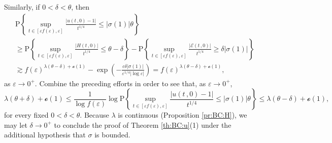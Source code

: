 \documentclass[reqno]{amsart}
\newcommand{\<}{\langle}
\renewcommand{\>}{\rangle}
\renewcommand{\P}{\mathrm{P}}
\newcommand{\1}{\mathbb{1}}
\renewcommand{\ge}{\geqslant}
\renewcommand{\le}{\leqslant}
\theoremstyle{definition}
\numberwithin{equation}{section}
\begin{document}
Similarly, if $0<\delta<\theta$, then
\begin{align*}
	&\P\left\{ \sup_{t \in [\varepsilon f(\varepsilon),\varepsilon]}
		\frac{|u(t\,,0)-1|}{t^{1/4}} \le |\sigma(1)|\theta \right\} \\
	&\ge \P\left\{ \sup_{t \in [\varepsilon f(\varepsilon),\varepsilon]}
		\frac{|H(t\,,0)|}{t^{1/4}} \le \theta - \delta \right\} - 
		\P\left\{ \sup_{t \in [\varepsilon f(\varepsilon),\varepsilon]}
		\frac{|\mathscr{E}(t\,,0)|}{t^{1/4}} \ge \delta |\sigma(1)| \right\}\\
	&\gtrsim f(\varepsilon)^{\lambda(\theta-\delta)+\mathscr{o}(1)} - 
		\exp\left( - \frac{c\delta|\sigma(1)|}{\varepsilon^{1/4}|\log\varepsilon|}\right)
		= f(\varepsilon)^{\lambda(\theta-\delta) + \mathscr{o}(1)},
\end{align*}
as $\varepsilon\to 0^+$. Combine the preceding efforts in order to see that,
as $\varepsilon\to0^+$,
\[
	\lambda(\theta+\delta) +\mathscr{o}(1) \le 
	\frac{1}{\log f(\varepsilon)}\log\P\left\{ \sup_{t \in [\varepsilon
	f(\varepsilon),\varepsilon]} 
	\frac{|u(t\,,0)-1|}{t^{1/4}} \le |\sigma(1)|\theta \right\}\le 
	\lambda(\theta-\delta) +\mathscr{o}(1),
\]
for every fixed $0<\delta<\theta$.
Because $\lambda$ is continuous (Proposition \ref{pr:BC:H}), we may 
let $\delta \to 0^+$ to conclude the proof of Theorem \ref{th:BC:u}(1) under the additional
hypothesis that $\sigma$ is bounded.\\
\end{document}
